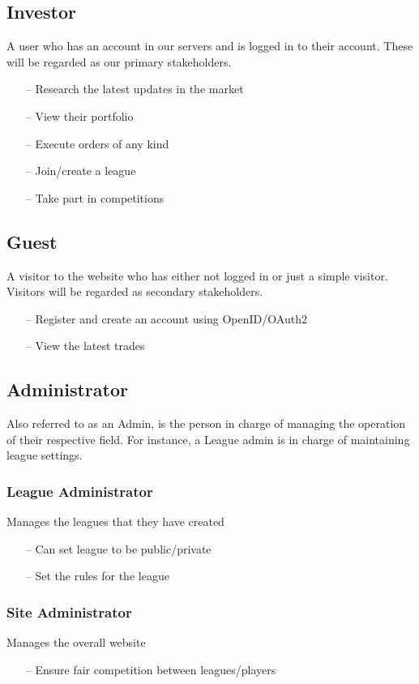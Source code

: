 
\subsection{Investor}
A user who has an account in our servers and is logged in to their account. These will be regarded as our primary stakeholders.\cite{wiki:Stakeholder}
\begin{itemize}
\item[--] Research the latest updates in the market
\item[--] View their portfolio
\item[--] Execute orders of any kind
\item[--] Join/create a league
\item[--] Take part in competitions
\end{itemize}

\subsection{Guest}
A visitor to the website who has either not logged in or just a simple visitor. Visitors will be regarded as secondary stakeholders.\cite{wiki:Stakeholder}
\begin{itemize}
\item[--] Register and create an account using OpenID/OAuth2
\item[--] View the latest trades
\end{itemize}

\subsection{Administrator}
Also referred to as an Admin, is the person in charge of managing the operation of their respective field. For instance, a League admin is in charge of maintaining league settings. 

\subsubsection{League Administrator}
Manages the leagues that they have created
\begin{itemize}
\item[--] Can set league to be public/private
\item[--] Set the rules for the league
\end{itemize}

\subsubsection{Site Administrator}
Manages the overall website
\begin{itemize}
\item[--] Ensure fair competition between leagues/players
\end{itemize}


